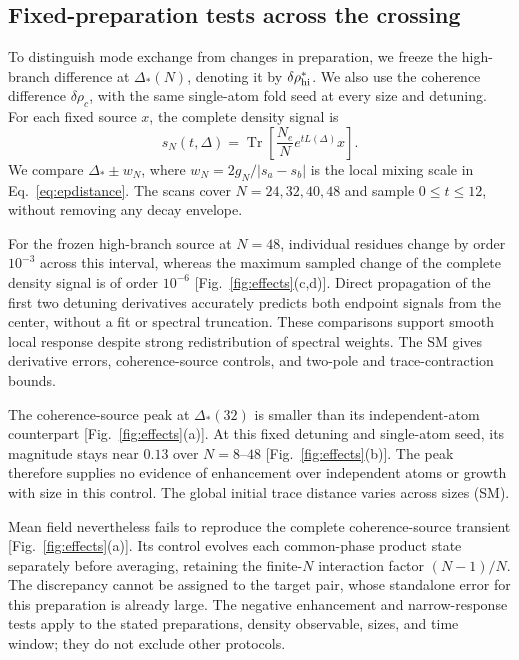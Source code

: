 \documentclass[aps,pra,twocolumn,superscriptaddress,amsmath,amssymb,reprint,floatfix]{revtex4-2}
\newcommand{\Tr}{\operatorname{Tr}}
\begin{document}
\subsection{Fixed-preparation tests across the crossing}
To distinguish mode exchange from changes in preparation, we freeze the high-branch difference at $\Delta_*(N)$, denoting it by $\delta\rho_{\rm hi}^*$. We also use the coherence difference $\delta\rho_c$, with the same single-atom fold seed at every size and detuning. For each fixed source $x$, the complete density signal is
\begin{equation}
 s_N(t,\Delta)=\Tr\!\left[\frac{N_e}{N}e^{tL(\Delta)}x\right].
 \label{eq:fixedsignal}
\end{equation}
We compare $\Delta_*\pm w_N$, where $w_N=2g_N/|s_a-s_b|$ is the local mixing scale in Eq.~\eqref{eq:epdistance}. The scans cover $N=24,32,40,48$ and sample $0\le t\le12$, without removing any decay envelope.

For the frozen high-branch source at $N=48$, individual residues change by order $10^{-3}$ across this interval, whereas the maximum sampled change of the complete density signal is of order $10^{-6}$ [Fig.~\ref{fig:effects}(c,d)]. Direct propagation of the first two detuning derivatives accurately predicts both endpoint signals from the center, without a fit or spectral truncation. These comparisons support smooth local response despite strong redistribution of spectral weights. The SM gives derivative errors, coherence-source controls, and two-pole and trace-contraction bounds.

The coherence-source peak at $\Delta_*(32)$ is smaller than its independent-atom counterpart [Fig.~\ref{fig:effects}(a)]. At this fixed detuning and single-atom seed, its magnitude stays near $0.13$ over $N=8$--$48$ [Fig.~\ref{fig:effects}(b)]. The peak therefore supplies no evidence of enhancement over independent atoms or growth with size in this control. The global initial trace distance varies across sizes (SM).

Mean field nevertheless fails to reproduce the complete coherence-source transient [Fig.~\ref{fig:effects}(a)]. Its control evolves each common-phase product state separately before averaging, retaining the finite-$N$ interaction factor $(N-1)/N$. The discrepancy cannot be assigned to the target pair, whose standalone error for this preparation is already large. The negative enhancement and narrow-response tests apply to the stated preparations, density observable, sizes, and time window; they do not exclude other protocols.
\end{document}
